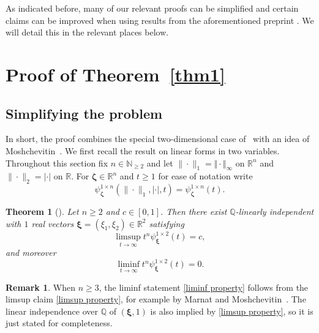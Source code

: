 \documentclass[10pt]{amsart}
\newtheorem{theorem}{Theorem}[section]
\theoremstyle{definition}
\newtheorem{remark}{Remark}
\newcommand{\ux}{\boldsymbol{\xi}}
\newcommand{\uz}{\boldsymbol{\zeta}}
\newcommand{\R}{\mathbb{R}}
\newcommand{\N}{\mathbb{N}}
\newcommand{\Q}{\mathbb{Q}}
\begin{document}
 As indicated before,
many of our relevant proofs can be simplified and certain claims can be improved when using results from the aforementioned preprint \cite{AginWeiss2024}. We will detail this in the relevant places below.


\section{Proof of Theorem~\ref{thm1}}

\subsection{Simplifying the problem  } \label{proof dual case}

In short, the proof combines the special two-dimensional case of~\cite{j2} with an idea of Moshchevitin~\cite{ngm}.
We first recall the result on linear forms in two variables. Throughout this section fix $n\in\N_{\geq 2}$ and let $\|\cdot\|_{1}=\Vert\cdot\Vert_{\infty}$ on $\R^{n}$ and $\|\cdot\|_{2}=|\cdot|$ on $\R$. For $\uz \in \R^{n}$ and $t\ge 1$ for ease of notation write
\begin{equation*}
\psi_{\uz}^{1\times n}(\|\cdot\|_{1},|\cdot|,t)=\psi_{\uz}^{1\times n}(t).
\end{equation*}


 \begin{theorem}[\cite{j2}] \label{thm2}
 	Let $n\ge 2$ and $c\in [0,1]$. Then there
 	exist $\Q$-linearly independent with $1$ real vectors $\ux=(\xi_1,\xi_2)\in\R^{2}$ satisfying
 	\begin{equation} 
  \label{limsup property}
 	\limsup_{t\to\infty} t^n \psi_{\ux}^{1\times 2}(t)= c,
 	\end{equation}
 	and moreover
 	\begin{equation} 
  \label{liminf property}
 	\liminf_{t\to\infty} t^n \psi_{\ux}^{1\times 2}(t)= 0.
 	\end{equation}
 \end{theorem}
 
\begin{remark}
	When $n\ge 3$, the liminf statement \eqref{liminf property} follows from the limsup claim \eqref{limsup property}, for example
	by Marnat and Moshchevitin~\cite{mamo}. The linear independence over $\Q$ of $(\ux,1)$
	is also implied by \eqref{limsup property}, so it is just stated for completeness.
\end{remark}
\end{document}

